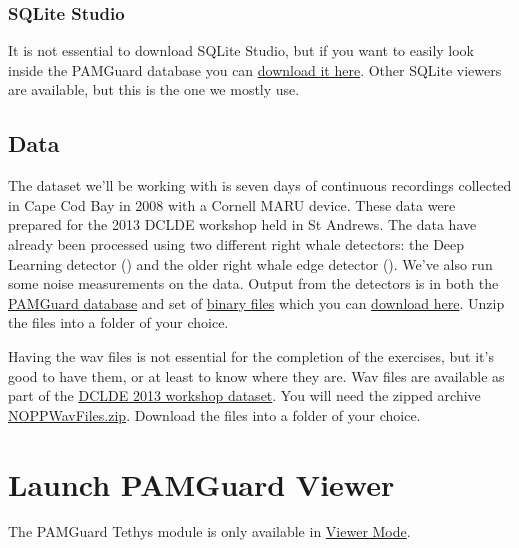 \documentclass[
]{article}
\begin{document}
\subsubsection{SQLite Studio}\label{sqlite-studio}

It is not essential to download SQLite Studio, but if you want to easily
look inside the PAMGuard database you can
\href{https://sqlitestudio.pl/}{download it here}. Other SQLite viewers
are available, but this is the one we mostly use.

\subsection{Data}\label{data}

The dataset we'll be working with is seven days of continuous recordings
collected in Cape Cod Bay in 2008 with a Cornell MARU device. These data
were prepared for the 2013 DCLDE workshop held in St Andrews. The data
have already been processed using two different right whale detectors:
the Deep Learning detector ()
and the older right whale edge detector
(). We've also run some
noise measurements on the data. Output from the detectors is in both the
\href{https://www.pamguard.org/olhelp/utilities/generalDatabaseHelp/docs/database_database.html}{PAMGuard
database} and set of
\href{https://www.pamguard.org/olhelp/utilities/BinaryStore/docs/binarystore_overview.html}{binary
files} which you can
\href{https://github.com/PAMGuardLearning/pamguard_tethys/releases/download/V1.1/NARWExampleDataset.zip}{download
here}. Unzip the files into a folder of your choice.

Having the wav files is not essential for the completion of the
exercises, but it's good to have them, or at least to know where they
are. Wav files are available as part of the
\href{https://doi.org/10.17630/62c3eebc-5574-4ec0-bfef-367ad839fe1a}{DCLDE
2013 workshop dataset}. You will need the zipped archive
\href{https://research-portal.st-andrews.ac.uk/files/264470819/NOPPWavFiles.zip}{NOPPWavFiles.zip}.
Download the files into a folder of your choice.

\section{Launch PAMGuard Viewer}\label{launch-pamguard-viewer}

The PAMGuard Tethys module is only available in
\href{https://www.pamguard.org/olhelp/overview/PamMasterHelp/docs/viewerMode.html}{Viewer
Mode}.
\end{document}
